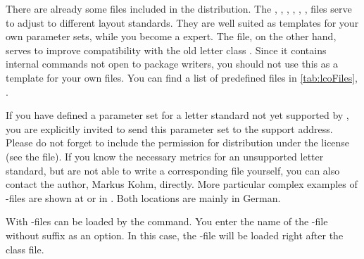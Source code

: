 There are already some  files included in the {\KOMAScript}
distribution. The , , ,
, , ,
 files serve to adjust
{\KOMAScript} to different layout standards. They are well suited as templates
for your own parameter sets, while you become a \KOMAScript{} expert. The
 file, on the other hand, serves to improve compatibility
with the old letter class .  Since it contains internal
commands not open to package writers, you should not use this as a template
for your own  files. You can find a list of predefined 
files in \autoref{tab:lcoFiles}, .

If you have defined a parameter set for a letter standard not yet supported by
\KOMAScript, you are explicitly invited to send this parameter set to the
{\KOMAScript} support address. Please do not forget to include the permission
for distribution under the {\KOMAScript} license (see the 
file). If you know the necessary metrics for an unsupported letter standard,
but are not able to write a corresponding  file yourself, you can
also contact the {\KOMAScript} author, Markus Kohm, directly. More
particular complex examples of -files are shown at \cite{homepage}
or in \cite{DANTE:TK0203:MJK}. Both locations are mainly in German. 

\begin{Declaration}
\end{Declaration}
With  -files can be loaded by the
 command. You enter the name of the -file
without suffix as an option. In this case, the -file
will be loaded right after the class file.

